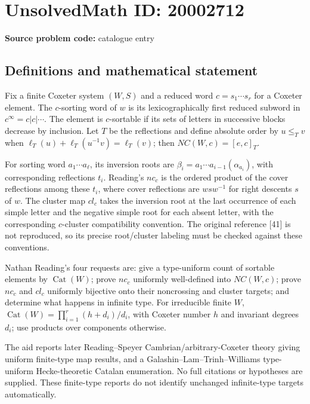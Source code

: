 \documentclass[11pt]{article}
\begin{document}
\section*{UnsolvedMath ID: 20002712}
\textbf{Source problem code:} catalogue entry
\subsection{Definitions and mathematical statement}
Fix a finite Coxeter system \((W,S)\) and a reduced word \(c=s_1\cdots s_r\) for a Coxeter element. The \(c\)-sorting word of \(w\) is its lexicographically first reduced subword in \(c^\infty=c|c|\cdots\). The element is \(c\)-sortable if its sets of letters in successive blocks decrease by inclusion. Let \(T\) be the reflections and define absolute order by \(u\le_Tv\) when \(\ell_T(u)+\ell_T(u^{-1}v)=\ell_T(v)\); then \(NC(W,c)=[e,c]_T\).

For sorting word \(a_1\cdots a_\ell\), its inversion roots are \(\beta_i=a_1\cdots a_{i-1}(\alpha_{a_i})\), with corresponding reflections \(t_i\). Reading's \(nc_c\) is the ordered product of the cover reflections among these \(t_i\), where cover reflections are \(w s w^{-1}\) for right descents \(s\) of \(w\). The cluster map \(cl_c\) takes the inversion root at the last occurrence of each simple letter and the negative simple root for each absent letter, with the corresponding \(c\)-cluster compatibility convention. The original reference [41] is not reproduced, so its precise root/cluster labeling must be checked against these conventions.

Nathan Reading's four requests are: give a type-uniform count of sortable elements by \(\operatorname{Cat}(W)\); prove \(nc_c\) uniformly well-defined into \(NC(W,c)\); prove \(nc_c\) and \(cl_c\) uniformly bijective onto their noncrossing and cluster targets; and determine what happens in infinite type. For irreducible finite \(W\), \(\operatorname{Cat}(W)=\prod_{i=1}^r(h+d_i)/d_i\), with Coxeter number \(h\) and invariant degrees \(d_i\); use products over components otherwise.

The aid reports later Reading--Speyer Cambrian/arbitrary-Coxeter theory giving uniform finite-type map results, and a Galashin--Lam--Trinh--Williams type-uniform Hecke-theoretic Catalan enumeration. No full citations or hypotheses are supplied. These finite-type reports do not identify unchanged infinite-type targets automatically.
\end{document}
